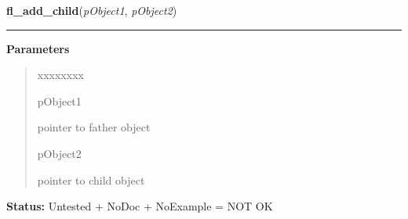     \label{xformslib:library:fl_add_child}

    \vspace{0.5ex}

\hspace{.8\funcindent}\begin{boxedminipage}{\funcwidth}

    \raggedright \textbf{fl\_add\_child}(\textit{pObject1}, \textit{pObject2})

    \vspace{-1.5ex}

    \rule{\textwidth}{0.5\fboxrule}
\setlength{\parskip}{2ex}
\setlength{\parskip}{1ex}
      \textbf{Parameters}
      \vspace{-1ex}

      \begin{quote}
        \begin{Ventry}{xxxxxxxx}

          \item[pObject1]

          pointer to father object

          \item[pObject2]

          pointer to child object

        \end{Ventry}

      \end{quote}

\textbf{Status:} Untested + NoDoc + NoExample = NOT OK



    \end{boxedminipage}

    \label{xformslib:library:fl_set_coordunit}

    \vspace{0.5ex}

